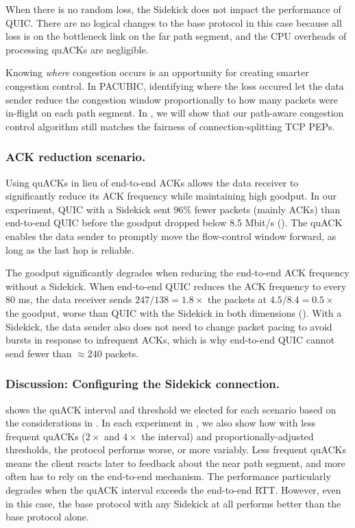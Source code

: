 When there is no random loss, the Sidekick does not impact the performance of
QUIC. There are no logical changes to the base protocol in this case because
all loss is on the bottleneck link on the far path segment, and the CPU
overheads of processing quACKs are negligible.

Knowing \emph{where} congestion occurs is an opportunity for creating smarter
congestion control. In PACUBIC, identifying where the loss occured let the data
sender reduce the congestion window proportionally to how many packets were
in-flight on each path segment. In , we
will show that our path-aware congestion control algorithm still matches the
fairness of connection-splitting TCP PEPs.

\subsubsection{ACK reduction scenario.}

Using quACKs in lieu of end-to-end ACKs allows the data receiver to
significantly reduce its ACK frequency while maintaining high goodput.
In our experiment, QUIC with a Sidekick sent $96\%$ fewer packets (mainly ACKs)
than end-to-end QUIC before the goodput dropped below 8.5 Mbit/s
().
The quACK enables the data sender to promptly move the flow-control window
forward, as long as the last hop is reliable.

The goodput significantly degrades when reducing the end-to-end ACK frequency
without a Sidekick. When end-to-end QUIC reduces the ACK frequency to every
80 ms, the data receiver sends $247 / 138 = 1.8\times$ the packets at
$4.5 / 8.4 = 0.5\times$ the goodput, worse than QUIC with the Sidekick
in both dimensions ().
With a Sidekick, the data sender also does not need to change packet pacing to
avoid bursts in response to infrequent ACKs, which is why end-to-end QUIC
cannot send fewer than $\approx 240$ packets.

\subsubsection{Discussion: Configuring the Sidekick connection.}

 shows the quACK interval and
threshold we elected for each scenario based on the considerations in
. In each experiment in
, we also show how with less frequent quACKs
($2\times$ and $4\times$ the interval) and proportionally-adjusted thresholds,
the protocol performs worse, or more variably. Less frequent quACKs means the
client reacts later to feedback about the near path segment, and more often has
to rely on the end-to-end mechanism. The performance particularly degrades when
the quACK interval exceeds the end-to-end RTT. However, even in this case, the
base protocol with any Sidekick at all performs better than the base protocol
alone\@.


